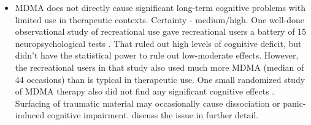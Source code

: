 \documentclass[12pt,letterpaper]{book}
\begin{document}
\begin{itemize}
	\item MDMA does not directly cause significant long-term cognitive problems with limited use in therapeutic contexts. Certainty - medium/high. One well-done observational study of recreational use gave recreational users a battery of 15 neuropsychological tests \cite{halpernMormonRavers}. That ruled out high levels of cognitive deficit, but didn't have the statistical power to rule out low-moderate effects. However, the recreational users in that study also used much more MDMA (median of 44 occasions) than is typical in therapeutic use. One small randomized study of MDMA therapy also did not find any significant cognitive effects \cite{mithoeferSafety}. Surfacing of traumatic material may occasionally cause dissociation or panic-induced cognitive impairment. \textcite{wolfgang2025,passieHistory} discuss the issue in further detail.
\end{itemize}
\end{document}
